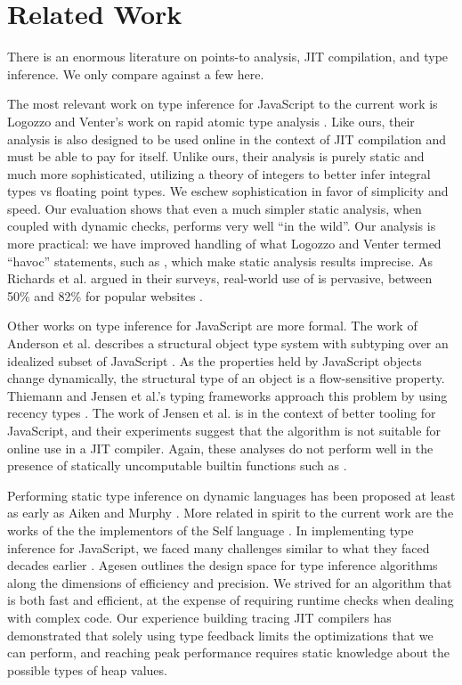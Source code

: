 \section{Related Work}
\label{sec:related-work}

There is an enormous literature on points-to analysis, JIT compilation, and
type inference. We only compare against a few here.

The most relevant work on type inference for JavaScript to the current work is
Logozzo and Venter's work on rapid atomic type analysis \cite{Logozzo10}.
Like ours, their analysis is also designed to be used online in the context of
JIT compilation and must be able to pay for itself. Unlike ours, their
analysis is purely static and much more sophisticated, utilizing a theory of
integers to better infer integral types vs floating point types. We eschew
sophistication in favor of simplicity and speed. Our evaluation shows that
even a much simpler static analysis, when coupled with dynamic checks, performs
very well ``in the wild''.
Our analysis is more
practical: we have improved handling of what Logozzo and Venter termed ``havoc''
statements, such as , which make static analysis results
imprecise. As Richards et al. argued in their surveys, real-world use of
 is pervasive, between 50\% and 82\% for popular websites
\cite{Richards11, Richards10}.

Other works on type inference for JavaScript are more formal. The work of
Anderson et al. describes a structural object type system with subtyping over
an idealized subset of JavaScript \cite{Anderson05}. As the properties held
by JavaScript objects change dynamically,
the structural type of an object is a flow-sensitive property. Thiemann
and Jensen et al.'s typing frameworks approach this problem by using recency
types \cite{Thiemann05, Jensen09}. The work of Jensen et al. is in the context
of better tooling for JavaScript, and their experiments suggest that the
algorithm is not suitable for online use in a JIT compiler. Again, these
analyses do not perform well in the presence of statically uncomputable
builtin functions such as .

Performing static type inference on dynamic languages has been proposed at
least as early as Aiken and Murphy \cite{Aiken91}. More related in spirit to
the current work are the works of the the implementors of the Self language
\cite{Ungar87}. In implementing type inference for JavaScript, we faced many
challenges similar to what they faced decades earlier \cite{Ungar92,
  Agesen94}. Agesen outlines the design space for type inference algorithms
along the dimensions of efficiency and precision. We strived for an
algorithm that is both fast and efficient, at the expense of requiring
runtime checks when dealing with complex code.
Our experience building tracing JIT compilers \cite{GalVEE09, GalPLDI09} has
demonstrated that solely using type feedback limits the optimizations that we
can perform, and reaching peak performance requires static knowledge about
the possible types of heap values.

